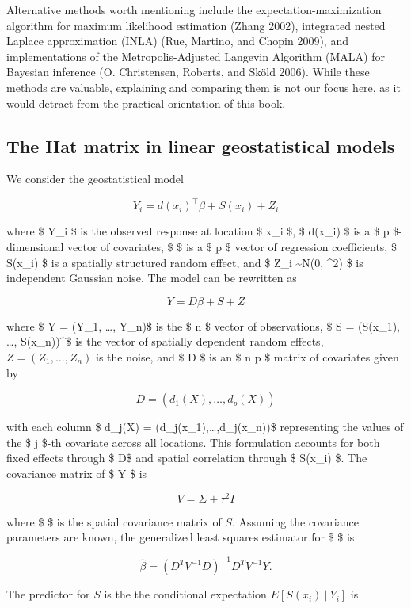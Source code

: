 \documentclass[
  letterpaper,
]{krantz}
\begin{document}
Alternative methods worth mentioning include the
expectation-maximization algorithm for maximum likelihood estimation
(Zhang 2002), integrated nested Laplace approximation (INLA) (Rue,
Martino, and Chopin 2009), and implementations of the
Metropolis-Adjusted Langevin Algorithm (MALA) for Bayesian inference (O.
Christensen, Roberts, and Sköld 2006). While these methods are valuable,
explaining and comparing them is not our focus here, as it would detract
from the practical orientation of this book.

\subsection{The Hat matrix in linear geostatistical
models}\label{sec-h-matrix}

We consider the geostatistical model

\[
Y_i = d(x_i)^\top \beta + S(x_i) + Z_i
\]

where \$ Y\_i \$ is the observed response at location \$ x\_i \$, \$
d(x\_i) \$ is a \$ p \$-dimensional vector of covariates, \$ \beta \$ is
a \$ p  \$ vector of regression coefficients, \$ S(x\_i) \$ is a
spatially structured random effect, and \$ Z\_i \sim N(0, \tau\^{}2) \$
is independent Gaussian noise. The model can be rewritten as

\[
Y = D\beta + S + Z
\]

where \$ Y = (Y\_1, \ldots, Y\_n)\top \$ is the \$ n  \$ vector
of observations, \$ S = (S(x\_1), \ldots, S(x\_n))\^{}\top \$ is the
vector of spatially dependent random effects, \(Z = (Z_1, \ldots, Z_n)\)
is the noise, and \$ D \$ is an \$ n \times p \$ matrix of covariates
given by

\[
D = (d_1(X), \ldots, d_p(X))
\]

with each column \$ d\_j(X) = (d\_j(x\_1),\ldots,d\_j(x\_n))\top \$
representing the values of the \$ j \$-th covariate across all
locations. This formulation accounts for both fixed effects through \$
D\beta \$ and spatial correlation through \$ S(x\_i) \$. The covariance
matrix of \$ Y \$ is

\[
V = \Sigma + \tau^2 I
\]

where \$ \Sigma \$ is the spatial covariance matrix of \(S\). Assuming
the covariance parameters are known, the generalized least squares
estimator for \$ \beta \$ is

\[
\hat{\beta} = (D^T V^{-1} D)^{-1} D^T V^{-1} Y.
\]

The predictor for \(S\) is the the conditional expectation
\(E[S(x_i) \: | \: Y_i]\) is
\end{document}
